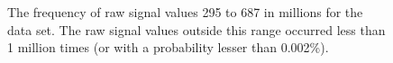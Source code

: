 \begin{figure}
	\centering

	\caption[The frequency of raw signal values.]{\label{fig:data-hist}The frequency of raw signal values 295 to 687 in millions for the data set. The raw signal values outside this range occurred less than 1 million times (or with a probability lesser than 0.002\%).}
\end{figure}
